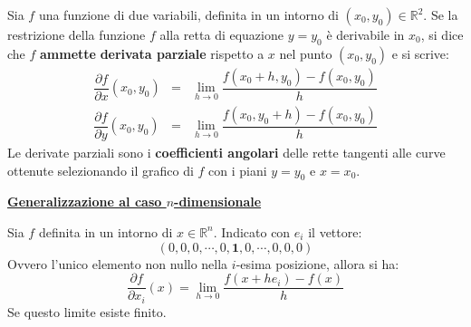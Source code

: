 \documentclass[a4paper]{article}
\newcommand{\definition}[1]{\textcolor{Red3}{\textbf{#1}}}
\begin{document}
	Sia $f$ una funzione di due variabili, definita in un intorno di $\left(x_{0}, y_{0}\right) \in \mathbb{R}^{2}$. Se la restrizione della funzione $f$ alla retta di equazione $y=y_{0}$ è derivabile in $x_{0}$, si dice che $f$ \textbf{ammette} \definition{derivata parziale} rispetto a $x$ nel punto $\left(x_{0}, y_{0}\right)$ e si scrive:
	\begin{equation}\label{eq: derivate parziali}
		\begin{array}{rcl}
			\dfrac{\partial f}{\partial x}\left(x_{0}, y_{0}\right) &=& \displaystyle\lim_{h \rightarrow 0} \dfrac{f\left(x_{0}+h, y_{0}\right) - f\left(x_{0}, y_{0}\right)}{h} \\ [2em]
			\dfrac{\partial f}{\partial y}\left(x_{0}, y_{0}\right) &=& \displaystyle\lim_{h \rightarrow 0} \dfrac{f\left(x_{0}, y_{0}+h\right) - f\left(x_{0}, y_{0}\right)}{h}
		\end{array}
	\end{equation}
	Le derivate parziali sono i \textbf{coefficienti angolari} delle rette tangenti alle curve ottenute selezionando il grafico di $f$ con i piani $y=y_{0}$ e $x=x_{0}$.

	\begin{flushleft}
		\textbf{\underline{Generalizzazione al caso $n$-dimensionale}}
	\end{flushleft}
	Sia $f$ definita in un intorno di $x \in \mathbb{R}^{n}$. Indicato con $e_{i}$ il vettore:
	\begin{equation*}
		\left(0,0,0,\cdots,0,\boldsymbol{1},0,\cdots,0,0,0\right)
	\end{equation*}
	Ovvero l'unico elemento non nullo nella $i$-esima posizione, allora si ha:
	\begin{equation}\label{eq: derivata parziale n-dimensionale}
		\dfrac{\partial f}{\partial x_{i}}\left(x\right) = \displaystyle\lim_{h \rightarrow 0} \dfrac{f\left(x+h e_{i}\right) - f\left(x\right)}{h}
	\end{equation}
	Se questo limite esiste finito.
\end{document}
